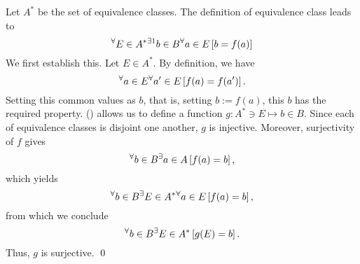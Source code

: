 \documentclass[a4paper,12pt]{article}
\begin{document}
\begin{sol}
	Let \( A^{\ast} \) be the set of equivalence classes.
	The definition of equivalence class leads to 
	\begin{equation}
		{}^{\forall}  E \in A^{\ast}
		{}^{\exists 1} b \in B
		{}^{\forall}  a \in E
		\left[ b = f(a) \right]\label{homeo:sec3E4}
	\end{equation}
	We first establish this.
	Let
	\( E \in A^{\ast} \).
	By definition, we have
	\begin{equation*}
		{}^{\forall}  a \in E
		{}^{\forall}  a' \in E
		\left[ f(a) = f(a') \right].
	\end{equation*}
	Setting this common values as \( b \), that is, setting
	\( b:=f(a) \),
	this \( b \) has the required property.
	() allows us to define a function
	\( g: A^{\ast}\ni E \mapsto b \in B \).
	Since each of equivalence classes is disjoint one another,
	\( g \) is injective.
	Moreover,
	surjectivity of \( f \) gives
	\begin{equation*}
		{}^{\forall}  b \in B
		{}^{\exists} a \in A
		\left[ f(a) =b \right],
	\end{equation*}
	which yields
	\begin{equation*}
		{}^{\forall}  b \in B
		{}^{\exists} E \in A^{\ast}
		{}^{\forall}  a \in E
		\left[ f(a) =b \right],
	\end{equation*}
	from which we conclude
	\begin{equation*}
		{}^{\forall}  b \in B
		{}^{\exists} E \in A^{\ast}
		\left[ g(E) =b \right].
	\end{equation*}
	Thus, \( g \) is surjective.
	\qed\end{sol}
\end{document}
